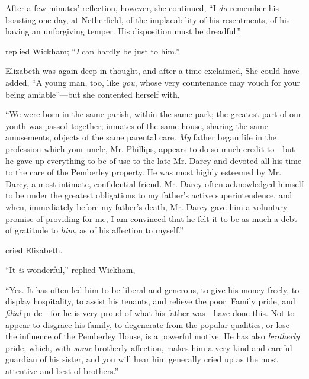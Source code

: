 After a few minutes' reflection, however, she continued, “I {\em do} remember his boasting one day, at Netherfield, of the implacability of his resentments, of his having an unforgiving temper. His disposition must be dreadful.”

 replied Wickham; “{\em I} can hardly be just to him.”

Elizabeth was again deep in thought, and after a time exclaimed,  She could have added, “A young man, too, like {\em you}, whose very countenance may vouch for your being amiable”---but she contented herself with, 

“We were born in the same parish, within the same park; the greatest part of our youth was passed together; inmates of the same house, sharing the same amusements, objects of the same parental care. {\em My} father began life in the profession which your uncle, Mr. Phillips, appears to do so much credit to---but he gave up everything to be of use to the late Mr. Darcy and devoted all his time to the care of the Pemberley property. He was most highly esteemed by Mr. Darcy, a most intimate, confidential friend. Mr. Darcy often acknowledged himself to be under the greatest obligations to my father's active superintendence, and when, immediately before my father's death, Mr. Darcy gave him a voluntary promise of providing for me, I am convinced that he felt it to be as much a debt of gratitude to {\em him}, as of his affection to myself.”

 cried Elizabeth. 

“It {\em is} wonderful,” replied Wickham, 


“Yes. It has often led him to be liberal and generous, to give his money freely, to display hospitality, to assist his tenants, and relieve the poor. Family pride, and {\em filial} pride---for he is very proud of what his father was---have done this. Not to appear to disgrace his family, to degenerate from the popular qualities, or lose the influence of the Pemberley House, is a powerful motive. He has also {\em brotherly} pride, which, with {\em some} brotherly affection, makes him a very kind and careful guardian of his sister, and you will hear him generally cried up as the most attentive and best of brothers.”


